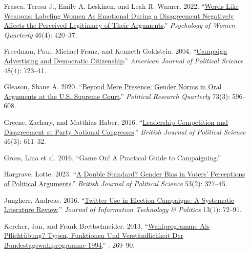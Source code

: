 \documentclass[a4paper,11pt]{article}
\newlength{\cslhangindent}
\newenvironment{CSLReferences}[2] %
 {\setlength{\cslhangindent}{#2\parindent}%
  \setlength{\parindent}{0pt}%
  \everypar{\setlength{\hangindent}{\cslhangindent}}\ignorespaces}
 {\par}
\begin{document}
\begin{CSLReferences}{1}{0}
\leavevmode{}%
Frasca, Teresa J., Emily A. Leskinen, and Leah R. Warner. 2022. {``\href{https://doi.org/10.1177/03616843221123745}{Words {Like Weapons}: {Labeling Women As Emotional During} a {Disagreement Negatively Affects} the {Perceived Legitimacy} of {Their Arguments}}.''} \emph{Psychology of Women Quarterly} 46(4): 420--37.

\leavevmode{}%
Freedman, Paul, Michael Franz, and Kenneth Goldstein. 2004. {``\href{https://doi.org/10.1111/j.0092-5853.2004.00098.x}{Campaign {Advertising} and {Democratic Citizenship}}.''} \emph{American Journal of Political Science} 48(4): 723--41.

\leavevmode{}%
Gleason, Shane A. 2020. {``\href{https://doi.org/10.1177/1065912919847001}{Beyond {Mere Presence}: {Gender Norms} in {Oral Arguments} at the {U}.{S}. {Supreme Court}}.''} \emph{Political Research Quarterly} 73(3): 596--608.

\leavevmode{}%
Greene, Zachary, and Matthias Haber. 2016. {``\href{https://doi.org/10.1017/S0007123414000283}{Leadership {Competition} and {Disagreement} at {Party National Congresses}}.''} \emph{British Journal of Political Science} 46(3): 611--32.

\leavevmode{}%
Gross, Lina et al. 2016. {``Game {On}! {A} Practical Guide to {Campaigning}.''}

\leavevmode{}%
Hargrave, Lotte. 2023. {``\href{https://doi.org/10.1017/S0007123422000515}{A {Double Standard}? {Gender Bias} in {Voters}' {Perceptions} of {Political Arguments}}.''} \emph{British Journal of Political Science} 53(2): 327--45.

\leavevmode{}%
Jungherr, Andreas. 2016. {``\href{https://doi.org/10.1080/19331681.2015.1132401}{Twitter Use in Election Campaigns: {A} Systematic Literature Review}.''} \emph{Journal of Information Technology \& Politics} 13(1): 72--91.

\leavevmode{}%
Kercher, Jan, and Frank Brettschneider. 2013. {``\href{https://doi.org/10.1007/978-3-658-01328-8_12}{Wahlprogramme Als {Pflichtübung}? {Typen}, {Funktionen} Und {Verständlichkeit} Der {Bundestagswahlprogramme} 1994}.''} : 269--90.


\end{CSLReferences}
\end{document}
